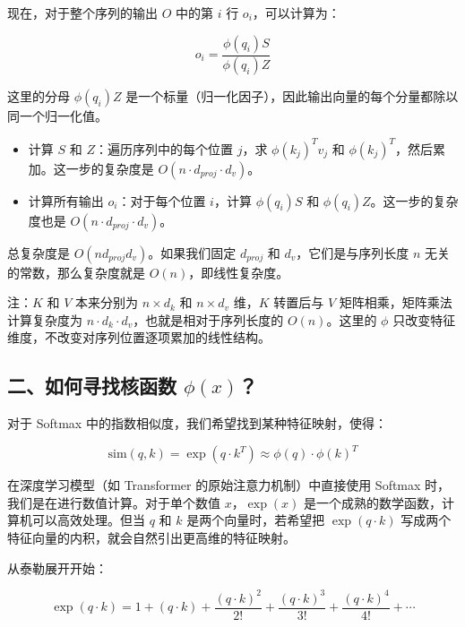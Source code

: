 现在，对于整个序列的输出 \(O\) 中的第 \(i\) 行 \(o_i\)，可以计算为：

\[
o_i = \frac{\phi(q_i)S}{\phi(q_i)Z}
\]

这里的分母 \(\phi(q_i)Z\) 是一个标量（归一化因子），因此输出向量的每个分量都除以同一个归一化值。

\begin{itemize}
\tightlist
\item
  计算 \(S\) 和 \(Z\)：遍历序列中的每个位置 \(j\)，求 \(\phi(k_j)^T v_j\) 和 \(\phi(k_j)^T\)，然后累加。这一步的复杂度是 \(O(n\cdot d_{proj}\cdot d_v)\)。
\item
  计算所有输出 \(o_i\)：对于每个位置 \(i\)，计算 \(\phi(q_i)S\) 和 \(\phi(q_i)Z\)。这一步的复杂度也是 \(O(n\cdot d_{proj}\cdot d_v)\)。
\end{itemize}

总复杂度是 \(O(nd_{proj}d_v)\)。如果我们固定 \(d_{proj}\) 和 \(d_v\)，它们是与序列长度 \(n\) 无关的常数，那么复杂度就是 \(O(n)\)，即线性复杂度。

注：\(K\) 和 \(V\) 本来分别为 \(n \times d_k\) 和 \(n \times d_v\) 维，\(K\) 转置后与 \(V\) 矩阵相乘，矩阵乘法计算复杂度为 \(n\cdot d_k\cdot d_v\)，也就是相对于序列长度的 \(O(n)\)。这里的 \(\phi\) 只改变特征维度，不改变对序列位置逐项累加的线性结构。

\hypertarget{ux4e8cux5982ux4f55ux5bfbux627eux6838ux51fdux6570-phix}{%
\subsection{\texorpdfstring{二、如何寻找核函数 \(\phi(x)\)？}{二、如何寻找核函数 \textbackslash phi(x)？}}\label{ux4e8cux5982ux4f55ux5bfbux627eux6838ux51fdux6570-phix}}

对于 Softmax 中的指数相似度，我们希望找到某种特征映射，使得：

\[
\mathrm{sim}(q,k) = \exp(q\cdot k^T) \approx \phi(q)\cdot\phi(k)^T
\]

在深度学习模型（如 Transformer 的原始注意力机制）中直接使用 Softmax 时，我们是在进行数值计算。对于单个数值 \(x\)，\(\exp(x)\) 是一个成熟的数学函数，计算机可以高效处理。但当 \(q\) 和 \(k\) 是两个向量时，若希望把 \(\exp(q\cdot k)\) 写成两个特征向量的内积，就会自然引出更高维的特征映射。

从泰勒展开开始：

\[
\exp(q\cdot k)
= 1 + (q\cdot k) + \frac{(q\cdot k)^2}{2!}
+ \frac{(q\cdot k)^3}{3!}
+ \frac{(q\cdot k)^4}{4!}
+ \cdots
\]

